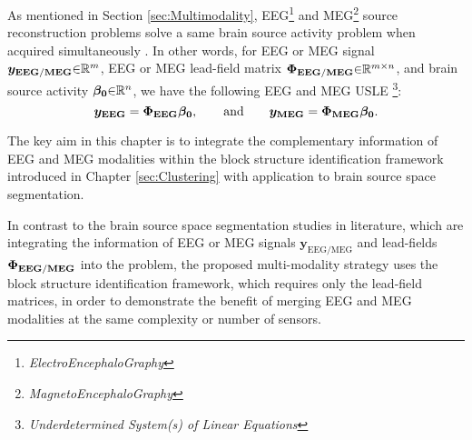 As mentioned in Section \ref{sec:Multimodality}, EEG\footnote{\emph{ElectroEncephaloGraphy}} and MEG\footnote{\emph{MagnetoEncephaloGraphy}} source reconstruction problems solve a same brain source activity problem when acquired simultaneously \cite{Molins2008}.
In other words, for EEG or MEG signal $\boldsymbol{y}_{\boldsymbol{\mathrm{EEG}} / \boldsymbol{\mathrm{MEG}}} {\in} \mathbb{R}^m$, EEG or MEG lead-field matrix $\boldsymbol{\Phi}_{\boldsymbol{\mathrm{EEG}} / \boldsymbol{\mathrm{MEG}}} {\in} \mathbb{R}^{m {\times} n}$, and brain source activity $\boldsymbol{\beta_0} {\in} \mathbb{R}^n$, we have the following EEG and MEG USLE \footnote{\emph{Underdetermined System(s) of Linear Equations}}:
\begin{equation*}
\boldsymbol{y}_{\boldsymbol{\mathrm{EEG}}} = \boldsymbol{\Phi}_{\boldsymbol{\mathrm{EEG}}} \boldsymbol{\beta_0}, \qquad \text{and} \qquad
\boldsymbol{y}_{\boldsymbol{\mathrm{MEG}}} = \boldsymbol{\Phi}_{\boldsymbol{\mathrm{MEG}}} \boldsymbol{\beta_0}.
\end{equation*}

The key aim in this chapter is to integrate the complementary information of EEG and MEG modalities within the block structure identification framework introduced in Chapter \ref{sec:Clustering} with application to brain source space segmentation.

In contrast to the brain source space segmentation studies in literature, which are integrating the information of EEG or MEG signals $\boldsymbol{y}_{\boldsymbol{\mathrm{EEG}} / \boldsymbol{\mathrm{MEG}}}$ and lead-fields $\boldsymbol{\Phi}_{\boldsymbol{\mathrm{EEG}} / \boldsymbol{\mathrm{MEG}}}$ into the problem, the proposed multi-modality strategy uses the block structure identification framework, which requires only the lead-field matrices, in order to demonstrate the benefit of merging EEG and MEG modalities at the same complexity or number of sensors.